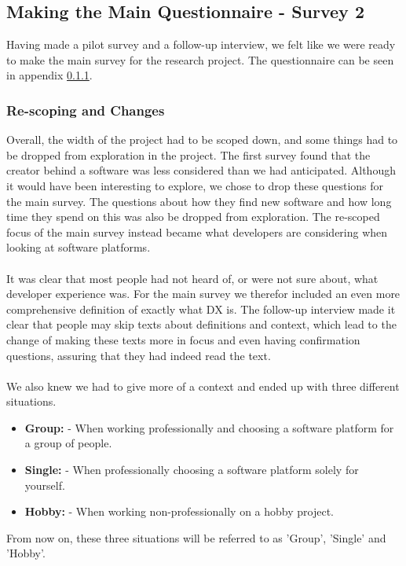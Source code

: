 \documentclass{cslthse-msc}
\begin{document}
    \subsection{Making the Main Questionnaire - Survey 2}

    Having made a pilot survey and a follow-up interview, we felt like we were ready to make the main survey for the research project.
    The questionnaire can be seen in appendix \ref{}.

    \subsubsection{Re-scoping and Changes}
    Overall, the width of the project had to be scoped down, and some
    things had to be dropped from exploration in the project. The
    first survey found that the creator behind a software was less
    considered than we had anticipated. Although it would have been interesting to explore, we chose to drop these questions for the main survey.
    The questions about how they find new software
    and how long time they spend on this was also be dropped from
    exploration. The re-scoped focus of the main survey instead became what developers are considering when looking at software platforms.
    \\ \\
    It was clear that most people had not heard of, or were not sure about,
    what developer experience was. For the main survey we therefor included an even more comprehensive definition of exactly what DX is.
    The follow-up interview made it clear that people may skip texts about definitions and context, which lead to the change of making these texts more in focus and even having confirmation questions, assuring that they had indeed read the text.
    \\ \\
    We also knew we had to give more of a context and ended up with three different situations.
    \begin{itemize}[label={}]
        \item \textbf{Group:} - When working professionally and choosing a software platform for a group of people.
        \item \textbf{Single:} - When professionally choosing a software platform solely for yourself.
        \item \textbf{Hobby:} - When working non-professionally on a hobby project.
    \end{itemize}
    From now on, these three situations will be referred to as 'Group', 'Single' and 'Hobby'.
\end{document}
